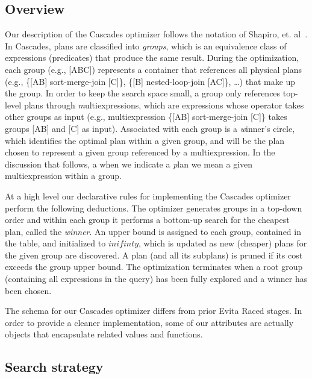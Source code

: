 \subsection{Overview}
\label{ch:opt:sec:overview}

Our description of the Cascades optimizer follows the notation of Shapiro, et.
al~\cite{Shapiro-opt}.  In Cascades, plans are classified into {\em groups},
which is an equivalence class of expressions (predicates) that produce the same
result.  During the optimization, each group (e.g., [ABC]) represents a
container that references all physical plans (e.g., \{[AB] sort-merge-join
[C]\}, \{[B] nested-loop-join [AC]\}, \ldots) that make up the group.  In order
to keep the search space small, a group only references top-level plans through
{\emph multiexpressions}, which are expressions whose operator takes other
groups as input (e.g., multiexpression \{[AB] sort-merge-join [C]\} takes groups [AB] and
[C] as input).  Associated with each group is a {\emph winner's circle}, which
identifies the optimal plan within a given group, and will be the plan chosen
to represent a given group referenced by a multiexpression.  In the discussion
that follows, a when we indicate a {\emph plan} we mean a given multiexpression
within a group.

At a high level our declarative rules for implementing the Cascades optimizer
perform the following deductions.  The optimizer generates groups in a top-down
order and within each group it performs a bottom-up search for the cheapest
plan, called the {\em winner}.  An upper bound is assigned to each group,
contained in the  table, and initialized to $inifinty$, which is
updated as new (cheaper) plans for the given group are discovered.  A plan (and
all its subplans) is pruned if its cost exceeds the group upper bound.  The
optimization terminates when a root group (containing all expressions in the
query) has been fully explored and a winner has been chosen. 

The schema for our Cascades optimizer differs from prior Evita Raced stages.
In order to provide a cleaner implementation, some of our attributes are
actually objects that encapsulate related values and functions. 


\subsection{Search strategy}
\label{ch:opt:sec:cascades_search}

